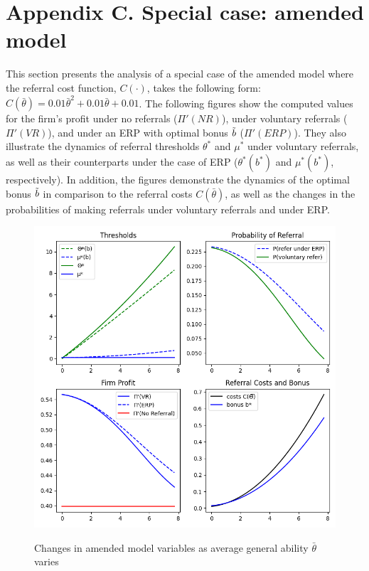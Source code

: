 \documentclass[12pt]{article}
\begin{document}
\section*{Appendix C. Special case: amended model} \label{sec:appendixc}
This section presents the analysis of a special case of the amended model where the referral cost function, $C(\cdot)$, takes the following form: $C(\bar{\theta}) = 0.01 \bar{\theta}^2 + 0.01 \bar{\theta} + 0.01$. The following figures show the computed values for the firm's profit under no referrals ($\Pi' (NR)$), under voluntary referrals ($\Pi'(VR)$), and under an ERP with optimal bonus $\Tilde{b}$ ($\Pi'(ERP)$). They also illustrate the dynamics of referral thresholds $\theta^*$ and $\mu^*$ under voluntary referrals, as well as their counterparts under the case of ERP ($\theta^*(b^*)$ and $\mu^*(b^*)$, respectively). In addition, the figures demonstrate the dynamics of the optimal bonus $\Tilde{b}$ in comparison to the referral costs $C(\bar{\theta})$, as well as the changes in the probabilities of making referrals under voluntary referrals and under ERP.

\begin{figure}[ht]
    \caption{Changes in amended model variables as average general ability $\bar{\theta}$ varies}
    \includegraphics[width=12cm]{images/perf_means_var.png}
    \centering
    \label{fig:ext_mean_var}
\end{figure}
\end{document}
